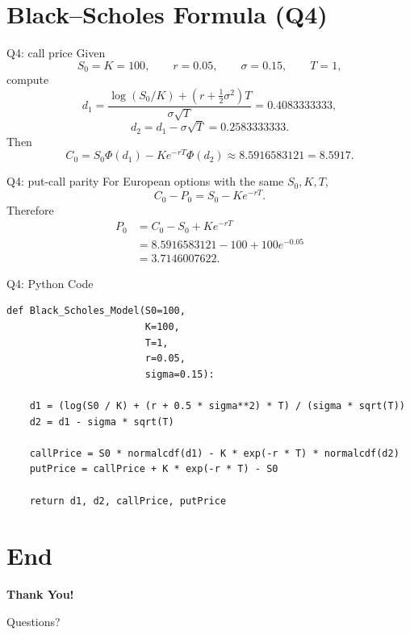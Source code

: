 \documentclass{beamer}
\begin{document}
\section[BS-Formula]{Black–Scholes Formula (Q4)}
\begin{frame}{Q4: call price}
Given
\[
S_0=K=100,\qquad r=0.05,\qquad \sigma=0.15,\qquad T=1,
\]
compute
\[
d_1=\frac{\log(S_0/K)+(r+\frac12\sigma^2)T}{\sigma\sqrt T}
=0.4083333333,
\]
\[
d_2=d_1-\sigma\sqrt T=0.2583333333.
\]
Then
\[
\boxed{
C_0=S_0\Phi(d_1)-Ke^{-rT}\Phi(d_2)\approx8.5916583121
=8.5917.
}
\]
\end{frame}

\begin{frame}{Q4: put-call parity}
For European options with the same $S_0,K,T$,
\[
C_0-P_0=S_0-Ke^{-rT}.
\]
Therefore
\begin{align*}
P_0
&=C_0-S_0+Ke^{-rT}\\
&=8.5916583121-100+100e^{-0.05}\\
&=\boxed{3.7146007622}.
\end{align*}
\end{frame}

\begin{frame}[fragile]{Q4: Python Code}
\begin{lstlisting}
def Black_Scholes_Model(S0=100,
                        K=100,
                        T=1,
                        r=0.05,
                        sigma=0.15):

    d1 = (log(S0 / K) + (r + 0.5 * sigma**2) * T) / (sigma * sqrt(T))
    d2 = d1 - sigma * sqrt(T)

    callPrice = S0 * normalcdf(d1) - K * exp(-r * T) * normalcdf(d2)
    putPrice = callPrice + K * exp(-r * T) - S0

    return d1, d2, callPrice, putPrice
\end{lstlisting}
\end{frame}

\section*{End}

\begin{frame}{}
\centering

\vfill

{\Huge\color{blue!70!black}\textbf{Thank You!}}

\vspace{1cm}

{\Large Questions?}

\vfill

\end{frame}
\end{document}
